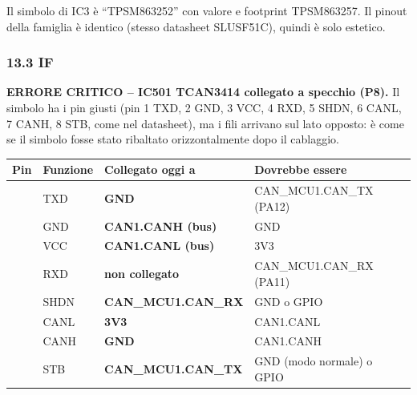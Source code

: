 {\small Il simbolo di IC3 è \textquotedblleft{}TPSM863252\textquotedblright{} con valore e footprint TPSM863257. Il pinout della famiglia è identico (stesso datasheet SLUSF51C), quindi è solo estetico.}

\subsubsection[13.3 IF]{13.3 IF}

\begin{critbox}
\textbf{ERRORE CRITICO – IC501 TCAN3414 collegato a specchio (P8).} Il simbolo ha i pin giusti (pin 1 TXD, 2 GND, 3 VCC, 4 RXD, 5 SHDN, 6 CANL, 7 CANH, 8 STB, come nel datasheet), ma i fili arrivano sul lato opposto: è come se il simbolo fosse stato ribaltato orizzontalmente dopo il cablaggio.
\begin{center}{\footnotesize{}\setlength{\tabcolsep}{4pt}\renewcommand{\arraystretch}{1.1}
\begin{tabularx}{\linewidth}{>{\hsize=0.2692\hsize\raggedright\arraybackslash}X>{\hsize=0.6632\hsize\raggedright\arraybackslash}X>{\hsize=1.4528\hsize\raggedright\arraybackslash}X>{\hsize=1.6148\hsize\raggedright\arraybackslash}X}
\toprule
\textbf{Pin} & \textbf{Funzione} & \textbf{Collegato oggi a} & \textbf{Dovrebbe essere} \\
\midrule
1 & TXD & \textcolor{tagcrit}{\textbf{GND}} & CAN\_\allowbreak{}MCU1.CAN\_\allowbreak{}TX (PA12) \\\midrule[0.15pt]
2 & GND & \textcolor{tagcrit}{\textbf{CAN1.CANH (bus)}} & GND \\\midrule[0.15pt]
3 & VCC & \textcolor{tagcrit}{\textbf{CAN1.CANL (bus)}} & 3V3 \\\midrule[0.15pt]
4 & RXD & \textcolor{tagcrit}{\textbf{non collegato}} & CAN\_\allowbreak{}MCU1.CAN\_\allowbreak{}RX (PA11) \\\midrule[0.15pt]
5 & SHDN & \textcolor{tagcrit}{\textbf{CAN\_\allowbreak{}MCU1.CAN\_\allowbreak{}RX}} & GND o GPIO \\\midrule[0.15pt]
6 & CANL & \textcolor{tagcrit}{\textbf{3V3}} & CAN1.CANL \\\midrule[0.15pt]
7 & CANH & \textcolor{tagcrit}{\textbf{GND}} & CAN1.CANH \\\midrule[0.15pt]
8 & STB & \textcolor{tagcrit}{\textbf{CAN\_\allowbreak{}MCU1.CAN\_\allowbreak{}TX}} & GND (modo normale) o GPIO \\
\bottomrule
\end{tabularx}}\end{center}

\end{critbox}
